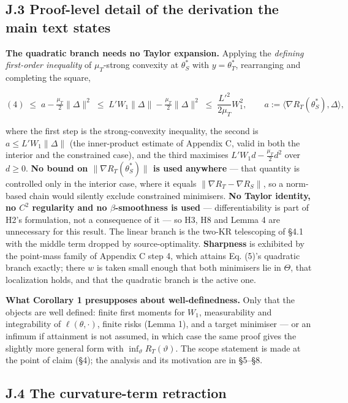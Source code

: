 \documentclass[pdflatex,sn-mathphys-ay]{sn-jnl}
\begin{document}
\subsection*{J.3 Proof-level detail of the derivation the main text states}

\textbf{The quadratic branch needs no Taylor expansion.} Applying the \emph{defining first-order inequality} of $\mu_T$-strong convexity at $\theta^*_S$ with $y=\theta^*_T$, rearranging and completing the square,

\[(4)\;\le\;a-\tfrac{\mu_T}{2}\|\Delta\|^2\;\le\;L'W_1\|\Delta\|-\tfrac{\mu_T}{2}\|\Delta\|^2\;\le\;\frac{L'^2}{2\mu_T}W_1^2,\qquad a:=\langle\nabla R_T(\theta^*_S),\Delta\rangle,\]

where the first step is the strong-convexity inequality, the second is $a\le L'W_1\|\Delta\|$ (the inner-product estimate of Appendix C, valid in both the interior and the constrained case), and the third maximises $L'W_1d-\tfrac{\mu_T}{2}d^2$ over $d\ge0$. \textbf{No bound on $\|\nabla R_T(\theta^*_S)\|$ is used anywhere} --- that quantity is controlled only in the interior case, where it equals $\|\nabla R_T-\nabla R_S\|$, so a norm-based chain would silently exclude constrained minimisers. \textbf{No Taylor identity, no $C^2$ regularity and no $\beta$-smoothness is used} --- differentiability is part of H2's formulation, not a consequence of it --- so H3, H8 and Lemma 4 are unnecessary for this result. The linear branch is the two-KR telescoping of \S{}4.1 with the middle term dropped by source-optimality. \textbf{Sharpness} is exhibited by the point-mass family of Appendix C step 4, which attains Eq. (5)'s quadratic branch exactly; there $w$ is taken small enough that both minimisers lie in $\Theta$, that localization holds, and that the quadratic branch is the active one.

\textbf{What Corollary 1 presupposes about well-definedness.} Only that the objects are well defined: finite first moments for $W_1$, measurability and integrability of $\ell(\theta,\cdot)$, finite risks (Lemma 1), and a target minimiser --- or an infimum if attainment is not assumed, in which case the same proof gives the slightly more general form with $\inf_\vartheta R_T(\vartheta)$. The scope statement is made at the point of claim (\S{}4); the analysis and its motivation are in \S{}5--\S{}8.

\subsection*{J.4 The curvature-term retraction}
\end{document}
